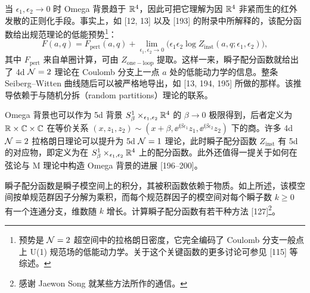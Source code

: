 当 $\epsilon_1,\epsilon_2\to 0$ 时 Omega 背景趋于 $\mathbb{R}^4$，因此可把它理解为因 $\mathbb{R}^4$ 非紧而生的红外发散的正则化手段。事实上，如 [12, 13] 以及 [193] 的附录中所解释的，该配分函数给出规范理论的低能预势\footnote{预势是 $\mathcal{N}=2$ 超空间中的拉格朗日密度，它完全编码了 Coulomb 分支一般点上 U(1) 规范场的低能动力学。关于这个关键函数的更多讨论可参见 [115] 等综述。}：
\begin{equation}
  F(a,q) = F_{\mathrm{pert}}(a,q) + \lim_{\epsilon_1,\epsilon_2\to 0}\Big(\epsilon_1\epsilon_2\log Z_{\mathrm{inst}}(a,q;\epsilon_1,\epsilon_2)\Big),
  \tag{5.30}
\end{equation}
其中 $F_{\mathrm{pert}}$ 来自单圈计算，可由 $Z_{\mathrm{one-loop}}$ 提取。这样一来，瞬子配分函数就给出了 4d $\mathcal{N}=2$ 理论在 Coulomb 分支上一点 $a$ 处的低能动力学的信息。整条 Seiberg--Witten 曲线随后可以被严格地导出，如 [13, 194, 195] 所做的那样。该推导依赖于与随机分拆（random partitions）理论的联系。


Omega 背景也可以作为 5d 背景 $S^1_\beta\times_{\epsilon_1,\epsilon_2}\mathbb{R}^4$ 的 $\beta\to0$ 极限得到，后者定义为 $\mathbb{R}\times\mathbb{C}\times\mathbb{C}$ 在等价关系 $(x,z_1,z_2)\sim(x+\beta,\ee^{\ii\beta\epsilon_1}z_1,\ee^{\ii\beta\epsilon_2}z_2)$ 下的商。许多 4d $\mathcal{N}=2$ 拉格朗日理论可以提升为 5d $\mathcal{N}=1$ 理论，此时瞬子配分函数 $Z_{\mathrm{inst}}$ 有 5d 的对应物，即定义为在 $S^1_\beta\times_{\epsilon_1,\epsilon_2}\mathbb{R}^4$ 上的配分函数。此外还值得一提关于如何在弦论与 M 理论中构造 Omega 背景的进展 [196--200]。

 瞬子配分函数是瞬子模空间上的积分，其被积函数依赖于物质。如上所述，该模空间按单规范群因子分解为乘积，而每个规范群因子的模空间对每个瞬子数 $k\ge0$ 有一个连通分支，维数随 $k$ 增长。计算瞬子配分函数有若干种方法 [127]\footnote{感谢 Jaewon Song 就某些方法所作的通信。}。

